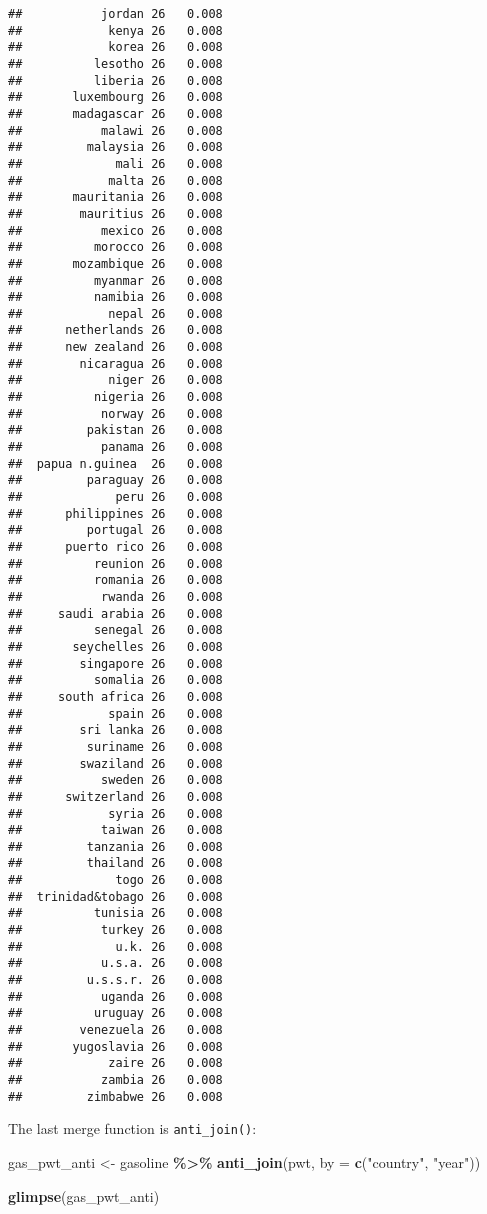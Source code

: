\documentclass[
]{article}
\newenvironment{Shaded}{\begin{snugshade}}{\end{snugshade}}
\newcommand{\DataTypeTok}[1]{\textcolor[rgb]{0.13,0.29,0.53}{#1}}
\newcommand{\KeywordTok}[1]{\textcolor[rgb]{0.13,0.29,0.53}{\textbf{#1}}}
\newcommand{\NormalTok}[1]{#1}
\newcommand{\OperatorTok}[1]{\textcolor[rgb]{0.81,0.36,0.00}{\textbf{#1}}}
\newcommand{\StringTok}[1]{\textcolor[rgb]{0.31,0.60,0.02}{#1}}
\begin{document}
\begin{verbatim}
##           jordan 26   0.008
##            kenya 26   0.008
##            korea 26   0.008
##          lesotho 26   0.008
##          liberia 26   0.008
##       luxembourg 26   0.008
##       madagascar 26   0.008
##           malawi 26   0.008
##         malaysia 26   0.008
##             mali 26   0.008
##            malta 26   0.008
##       mauritania 26   0.008
##        mauritius 26   0.008
##           mexico 26   0.008
##          morocco 26   0.008
##       mozambique 26   0.008
##          myanmar 26   0.008
##          namibia 26   0.008
##            nepal 26   0.008
##      netherlands 26   0.008
##      new zealand 26   0.008
##        nicaragua 26   0.008
##            niger 26   0.008
##          nigeria 26   0.008
##           norway 26   0.008
##         pakistan 26   0.008
##           panama 26   0.008
##  papua n.guinea  26   0.008
##         paraguay 26   0.008
##             peru 26   0.008
##      philippines 26   0.008
##         portugal 26   0.008
##      puerto rico 26   0.008
##          reunion 26   0.008
##          romania 26   0.008
##           rwanda 26   0.008
##     saudi arabia 26   0.008
##          senegal 26   0.008
##       seychelles 26   0.008
##        singapore 26   0.008
##          somalia 26   0.008
##     south africa 26   0.008
##            spain 26   0.008
##        sri lanka 26   0.008
##         suriname 26   0.008
##        swaziland 26   0.008
##           sweden 26   0.008
##      switzerland 26   0.008
##            syria 26   0.008
##           taiwan 26   0.008
##         tanzania 26   0.008
##         thailand 26   0.008
##             togo 26   0.008
##  trinidad&tobago 26   0.008
##          tunisia 26   0.008
##           turkey 26   0.008
##             u.k. 26   0.008
##           u.s.a. 26   0.008
##         u.s.s.r. 26   0.008
##           uganda 26   0.008
##          uruguay 26   0.008
##        venezuela 26   0.008
##       yugoslavia 26   0.008
##            zaire 26   0.008
##           zambia 26   0.008
##         zimbabwe 26   0.008
\end{verbatim}

The last merge function is \texttt{anti\_join()}:

\begin{Shaded}
\begin{Highlighting}[]
\NormalTok{gas\_pwt\_anti \textless{}{-}}\StringTok{ }\NormalTok{gasoline }\OperatorTok{\%\textgreater{}\%}
\StringTok{  }\KeywordTok{anti\_join}\NormalTok{(pwt, }\DataTypeTok{by =} \KeywordTok{c}\NormalTok{(}\StringTok{"country"}\NormalTok{, }\StringTok{"year"}\NormalTok{))}

\KeywordTok{glimpse}\NormalTok{(gas\_pwt\_anti)}
\end{Highlighting}
\end{Shaded}
\end{document}
